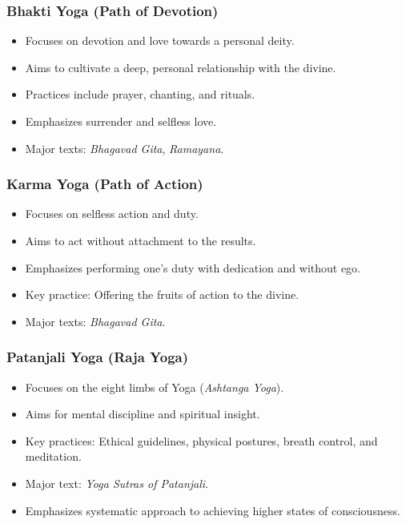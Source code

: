 \begin{frame}[fragile]\frametitle{Bhakti Yoga (Path of Devotion)}

      \begin{itemize}
		\item Focuses on devotion and love towards a personal deity.
		\item Aims to cultivate a deep, personal relationship with the divine.
		\item Practices include prayer, chanting, and rituals.
		\item Emphasizes surrender and selfless love.
		\item Major texts: \textit{Bhagavad Gita}, \textit{Ramayana}.
	  \end{itemize}

\end{frame}

\begin{frame}[fragile]\frametitle{Karma Yoga (Path of Action)}

      \begin{itemize}
		\item Focuses on selfless action and duty.
		\item Aims to act without attachment to the results.
		\item Emphasizes performing one's duty with dedication and without ego.
		\item Key practice: Offering the fruits of action to the divine.
		\item Major texts: \textit{Bhagavad Gita}.
	  \end{itemize}

\end{frame}

\begin{frame}[fragile]\frametitle{Patanjali Yoga (Raja Yoga)}

      \begin{itemize}
		\item Focuses on the eight limbs of Yoga (\textit{Ashtanga Yoga}).
		\item Aims for mental discipline and spiritual insight.
		\item Key practices: Ethical guidelines, physical postures, breath control, and meditation.
		\item Major text: \textit{Yoga Sutras of Patanjali}.
		\item Emphasizes systematic approach to achieving higher states of consciousness.
	  \end{itemize}

\end{frame}

